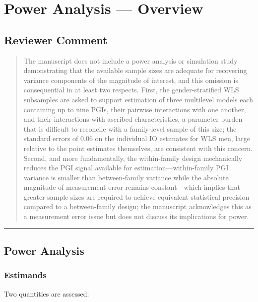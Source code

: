 \documentclass[
]{article}
\author{}
\date{}
\begin{document}
\section{Power Analysis --- Overview}\label{power-analysis-overview}

\subsection{Reviewer Comment}\label{reviewer-comment}

\begin{quote}
The manuscript does not include a power analysis or simulation study
demonstrating that the available sample sizes are adequate for
recovering variance components of the magnitude of interest, and this
omission is consequential in at least two respects. First, the
gender-stratified WLS subsamples are asked to support estimation of
three multilevel models each containing up to nine PGIs, their pairwise
interactions with one another, and their interactions with ascribed
characteristics, a parameter burden that is difficult to reconcile with
a family-level sample of this size; the standard errors of 0.06 on the
individual IO estimates for WLS men, large relative to the point
estimates themselves, are consistent with this concern. Second, and more
fundamentally, the within-family design mechanically reduces the PGI
signal available for estimation---within-family PGI variance is smaller
than between-family variance while the absolute magnitude of measurement
error remains constant---which implies that greater sample sizes are
required to achieve equivalent statistical precision compared to a
between-family design; the manuscript acknowledges this as a measurement
error issue but does not discuss its implications for power.
\end{quote}

\begin{center}\rule{0.5\linewidth}{0.5pt}\end{center}

\subsection{Power Analysis}\label{power-analysis}

\subsubsection{Estimands}\label{estimands}

Two quantities are assessed:
\end{document}
